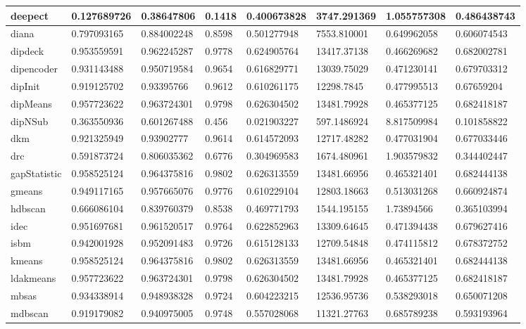 \begin{table}[H]
\begin{tabular}{|l|l|l|l|l|l|l|l|}
\hline
deepect & 0.127689726 & 0.38647806 & 0.1418 & 0.400673828 & 3747.291369 & 1.055757308 & 0.486438743 \\
\hline
diana & 0.797093165 & 0.884002248 & 0.8598 & 0.501277948 & 7553.810001 & 0.649962058 & 0.606074543 \\
\hline
dipdeck & 0.953559591 & 0.962245287 & 0.9778 & 0.624905764 & 13417.37138 & 0.466269682 & 0.682002781 \\
\hline
dipencoder & 0.931143488 & 0.950719584 & 0.9654 & 0.616829771 & 13039.75029 & 0.471230141 & 0.679703312 \\
\hline
dipInit & 0.919125702 & 0.93395766 & 0.9612 & 0.610261175 & 12298.7845 & 0.477995513 & 0.67659204 \\
\hline
dipMeans & 0.957723622 & 0.963724301 & 0.9798 & 0.626304502 & 13481.79928 & 0.465377125 & 0.682418187 \\
\hline
dipNSub & 0.363550936 & 0.601267488 & 0.456 & 0.021903227 & 597.1486924 & 8.817509984 & 0.101858822 \\
\hline
dkm & 0.921325949 & 0.93902777 & 0.9614 & 0.614572093 & 12717.48282 & 0.477031904 & 0.677033446 \\
\hline
drc & 0.591873724 & 0.806035362 & 0.6776 & 0.304969583 & 1674.480961 & 1.903579832 & 0.344402447 \\
\hline
gapStatistic & 0.958525124 & 0.964375816 & 0.9802 & 0.626313559 & 13481.66956 & 0.465321401 & 0.682444138 \\
\hline
gmeans & 0.949117165 & 0.957665076 & 0.9776 & 0.610229104 & 12803.18663 & 0.513031268 & 0.660924874 \\
\hline
hdbscan & 0.666086104 & 0.839760379 & 0.8538 & 0.469771793 & 1544.195155 & 1.73894566 & 0.365103994 \\
\hline
idec & 0.951697681 & 0.961520517 & 0.9764 & 0.622852963 & 13309.64645 & 0.471394438 & 0.679627416 \\
\hline
isbm & 0.942001928 & 0.952091483 & 0.9726 & 0.615128133 & 12709.54848 & 0.474115812 & 0.678372752 \\
\hline
kmeans & 0.958525124 & 0.964375816 & 0.9802 & 0.626313559 & 13481.66956 & 0.465321401 & 0.682444138 \\
\hline
ldakmeans & 0.957723622 & 0.963724301 & 0.9798 & 0.626304502 & 13481.79928 & 0.465377125 & 0.682418187 \\
\hline
mbsas & 0.934338914 & 0.948938328 & 0.9724 & 0.604223215 & 12536.95736 & 0.538293018 & 0.650071208 \\
\hline
mdbscan & 0.919179082 & 0.940975005 & 0.9748 & 0.557028068 & 11321.27763 & 0.685789238 & 0.593193964 \\

\end{tabular}
\end{table}
